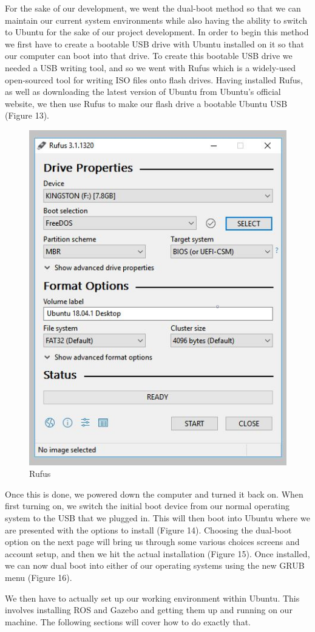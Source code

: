 \documentclass[12pt]{report}
\begin{document}
For the sake of our development, we went the dual-boot method so that we can maintain our current system environments while also having the ability to switch to Ubuntu for the sake of our project development. In order to begin this method we first have to create a bootable USB drive with Ubuntu installed on it so that our computer can boot into that drive. To create this bootable USB drive we needed a USB writing tool, and so we went with Rufus which is a widely-used open-sourced tool for writing ISO files onto flash drives. Having installed Rufus, as well as downloading the latest version of Ubuntu from Ubuntu's official website, we then use Rufus to make our flash drive a bootable Ubuntu USB (Figure 13).





\begin{figure}[h]
	\centering
	\includegraphics[width=0.50\linewidth]{rufus}
	\caption{Rufus}
\end{figure}

Once this is done, we powered down the computer and turned it back on. When first turning on, we switch the initial boot device from our normal operating system to the USB that we plugged in. This will then boot into Ubuntu where we are presented with the options to install (Figure 14). Choosing the dual-boot option on the next page will bring us through some various choices screens and account setup, and then we hit the actual installation (Figure 15). Once installed, we can now dual boot into either of our operating systems using the new GRUB menu (Figure 16).

We then have to actually set up our working environment within Ubuntu. This involves installing ROS and Gazebo and getting them up and running on our machine. The following sections will cover how to do exactly that.
 
\end{document}
